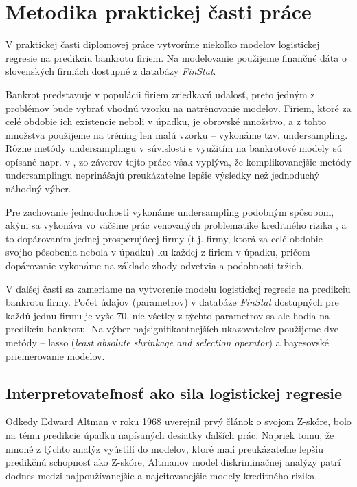\section{Metodika praktickej časti práce}
\label{metodika}

V praktickej časti diplomovej práce vytvoríme niekoľko modelov logistickej regresie na predikciu bankrotu firiem.
Na modelovanie použijeme finančné dáta o slovenských firmách dostupné z databázy \emph{FinStat}.

Bankrot predstavuje v populácii firiem zriedkavú udalosť, preto jedným z problémov bude vybrať vhodnú vzorku na natrénovanie modelov.
Firiem, ktoré za celé obdobie ich existencie neboli v úpadku, je obrovské množstvo, a z tohto množstva použijeme na tréning len malú vzorku – vykonáme tzv. undersampling.
Rôzne metódy undersamplingu v súvislosti s využitím na bankrotové modely sú opísané napr. v \cite{protopapadakis},
zo záverov tejto práce však vyplýva, že komplikovanejšie metódy undersamplingu neprinášajú preukázateľne lepšie výsledky než jednoduchý náhodný výber.

Pre zachovanie jednoduchosti vykonáme undersampling podobným spôsobom, akým sa vykonáva vo väčšine prác venovaných problematike kreditného rizika \cite{zmijewski},
a to dopárovaním jednej prosperujúcej firmy (t.j. firmy, ktorá za celé obdobie svojho pôsobenia nebola v úpadku) ku každej z firiem v úpadku,
pričom dopárovanie vykonáme na základe zhody odvetvia a podobnosti tržieb.

V ďalšej časti sa zameriame na vytvorenie modelu logistickej regresie na predikciu bankrotu firmy.
Počet údajov (parametrov) v databáze \emph{FinStat} dostupných pre každú jednu firmu je vyše 70, nie všetky z týchto parametrov sa ale hodia na predikciu bankrotu.
Na výber najsignifikantnejších ukazovateľov použijeme dve metódy – lasso (\emph{least absolute shrinkage and selection operator}) a bayesovské priemerovanie modelov.

\subsection{Interpretovateľnosť ako sila logistickej regresie} \label{model interpretability}

Odkedy Edward Altman v roku 1968 uverejnil prvý článok o svojom Z-skóre, bolo na tému predikcie úpadku napísaných desiatky ďalších prác.
Napriek tomu, že mnohé z týchto analýz vyústili do modelov, ktoré mali preukázateľne lepšiu predikčnú schopnosť ako Z-skóre,
Altmanov model diskriminačnej analýzy patrí dodnes medzi najpoužívanejšie a najcitovanejšie modely kreditného rizika. %

